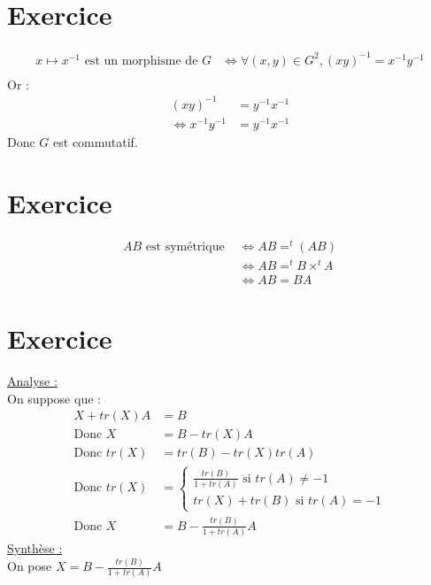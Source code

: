 \documentclass{report}
\begin{document}
\setcounter{chapter}{10}
\setcounter{section}{14}
\section{Exercice}
\begin{align*}
    x \mapsto x^{-1} \text{ est un morphisme de } G &\Leftrightarrow \forall (x,y) \in G^2, (xy)^{-1} = x^{-1}y^{-1} \\
\end{align*}
Or : 
\begin{align*}
    (xy)^{-1} &= y^{-1}x^{-1} \\
    \Leftrightarrow x^{-1}y^{-1} &= y^{-1}x^{-1}
\end{align*}
Donc $G$ est commutatif.

\setcounter{chapter}{11}
\setcounter{section}{0}
\section{Exercice}
\begin{align*}
    AB \text{ est symétrique } &\Leftrightarrow AB = ^t(AB) \\
    &\Leftrightarrow AB = ^tB \times ^tA \\
    &\Leftrightarrow AB = BA
\end{align*}

\setcounter{section}{3}
\section{Exercice}
\underline{Analyse :} \\
On suppose que :
\begin{align*}
    X + tr(X)A &= B \\
    \text{Donc } X &= B - tr(X)A \\
    \text{Donc } tr(X) &= tr(B) - tr(X)tr(A) \\
    \text{Donc } tr(X) &=
    \begin{cases}
        \frac{tr(B)}{1+tr(A)} \text{ si } tr(A) \neq -1\\
        tr(X) + tr(B) \text{ si } tr(A) = -1
    \end{cases} \\
    \text{Donc } X &= B - \frac{tr(B)}{1+tr(A)}A
\end{align*} 
\underline{Synthèse :} \\
On pose $X = B - \frac{tr(B)}{1+tr(A)}A$ \\

\setcounter{section}{14}
\end{document}
